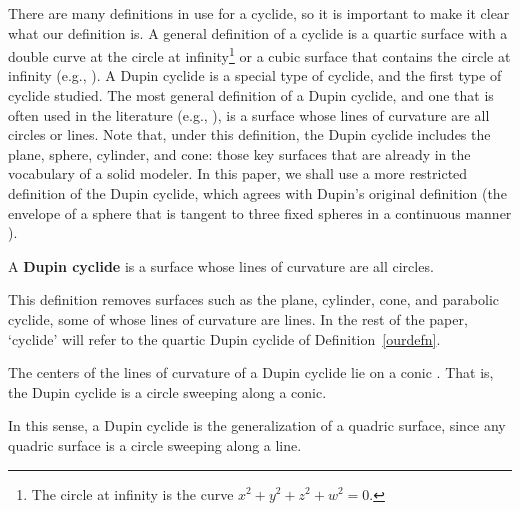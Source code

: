 There are many definitions in use for a cyclide,
so it is important to make it clear what our definition is.
A general definition of a cyclide is 
a quartic surface with a double curve at the circle at infinity\footnote{The
	circle at infinity is the curve $x^{2} + y^{2} + z^{2} + w^{2} = 0$.}
or a cubic surface that contains the circle at infinity
(e.g., \cite{F12,SOM47}). %
A Dupin cyclide is a special type of cyclide,
and the first type of cyclide studied.
The most general definition of a Dupin cyclide, 
and one that is often used in the literature (e.g., \cite{CDH89a,FISCH86}),
is a surface whose lines of curvature are all circles or lines.
Note that, under this definition, the Dupin cyclide includes 
the plane, sphere, cylinder, and cone: those key surfaces that are
already in the vocabulary of a solid modeler.
In this paper, we shall use a more restricted definition of the Dupin cyclide,
which agrees with Dupin's original definition 
(the envelope of a sphere
that is tangent to three fixed spheres in a continuous manner \cite{MAX68}).

\begin{defn2}
\label{ourdefn}
A {\bf Dupin cyclide} is a surface whose lines of curvature are all circles.
\end{defn2}

This definition removes surfaces such as the plane, cylinder, cone, and 
parabolic cyclide, some of whose lines of curvature are lines.
In the rest of the paper, `cyclide' will refer to the quartic Dupin cyclide
of Definition~\ref{ourdefn}.

\begin{rmk}
\label{rmk:conic}
The centers of the lines of curvature of a Dupin cyclide 
lie on a conic \cite{F12,H52}. 
That is, the Dupin cyclide is a circle sweeping along a conic.
\end{rmk}

In this sense, a Dupin cyclide is the generalization of a quadric surface,
since any quadric surface is a circle sweeping along a line.



